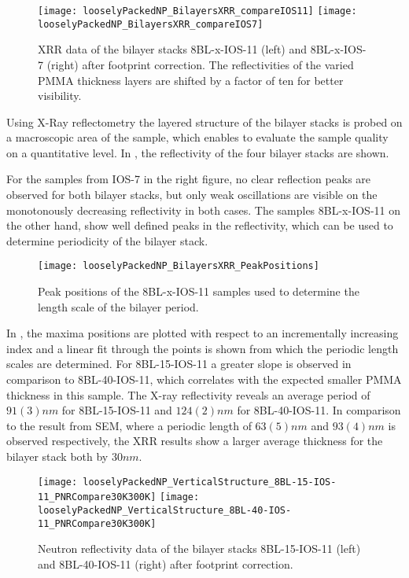 \documentclass[\main/dresen_thesis.tex]{subfiles}
\begin{document}
  \label{sec:looselyPackedNS:bilayerStacks:xrr}
  \begin{figure}[tb]
    \centering
    \texttt{[image: looselyPackedNP\_BilayersXRR\_compareIOS11]}
    \texttt{[image: looselyPackedNP\_BilayersXRR\_compareIOS7]}
    \caption{\label{fig:looselyPackedNS:bilayerStacks:xrr}XRR data of the bilayer stacks 8BL-x-IOS-11 (left) and 8BL-x-IOS-7 (right) after footprint correction. The reflectivities of the varied PMMA thickness layers are shifted by a factor of ten for better visibility.}
  \end{figure}

  Using X-Ray reflectometry the layered structure of the bilayer stacks is probed on a macroscopic area of the sample, which enables to evaluate the sample quality on a quantitative level.
  In , the reflectivity of the four bilayer stacks are shown.

  For the samples from IOS-7 in the right figure, no clear reflection peaks are observed for both bilayer stacks, but only weak oscillations are visible on the monotonously decreasing reflectivity in both cases.
  The samples 8BL-x-IOS-11 on the other hand, show well defined peaks in the reflectivity, which can be used to determine periodicity of the bilayer stack.


  \begin{figure}[tb]
    \centering
    \texttt{[image: looselyPackedNP\_BilayersXRR\_PeakPositions]}
    \caption{\label{fig:looselyPackedNS:bilayerStacks:xrrPeaks}Peak positions of the 8BL-x-IOS-11 samples used to determine the length scale of the bilayer period.}
  \end{figure}

  In , the maxima positions are plotted with respect to an incrementally increasing index and a linear fit through the points is shown from which the periodic length scales are determined.
  For 8BL-15-IOS-11 a greater slope is observed in comparison to 8BL-40-IOS-11, which correlates with the expected smaller PMMA thickness in this sample.
  The X-ray reflectivity reveals an average period of $91(3) \unit{nm}$ for 8BL-15-IOS-11 and $124(2) \unit{nm}$ for 8BL-40-IOS-11.
  In comparison to the result from SEM, where a periodic length of $63(5) \unit{nm}$ and $93(4) \unit{nm}$ is observed respectively, the XRR results show a larger average thickness for the bilayer stack both by $30 \unit{nm}$.

  \begin{figure}[tb]
    \centering
    \texttt{[image: looselyPackedNP\_VerticalStructure\_8BL-15-IOS-11\_PNRCompare30K300K]}
    \texttt{[image: looselyPackedNP\_VerticalStructure\_8BL-40-IOS-11\_PNRCompare30K300K]}
    \caption{\label{fig:looselyPackedNS:bilayerStacks:nr300K8BLIOS11}Neutron reflectivity data of the bilayer stacks 8BL-15-IOS-11 (left) and 8BL-40-IOS-11 (right) after footprint correction.}
  \end{figure}
\end{document}
